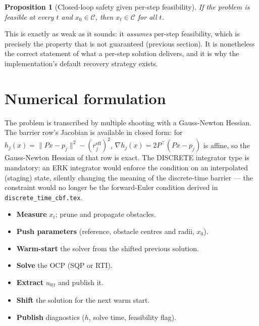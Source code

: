 \documentclass[11pt]{article}
\newtheorem{proposition}{Proposition}
\begin{document}
\begin{proposition}[Closed-loop safety given per-step feasibility]
If the problem is feasible at every $t$ and $x_0 \in \mathcal{C}$, then $x_t \in \mathcal{C}$ for
all $t$.
\end{proposition}
This is exactly as weak as it sounds: it \emph{assumes} per-step feasibility, which is precisely
the property that is not guaranteed (previous section). It is nonetheless the correct statement of
what a per-step solution delivers, and it is why the implementation's default recovery strategy
exists.

\section{Numerical formulation}
The problem is transcribed by multiple shooting with a Gauss-Newton Hessian. The barrier row's
Jacobian is available in closed form: for $h_j(x) = \|Px - p_j\|^2 - (r_j^{\mathrm{eff}})^2$,
$\nabla h_j(x) = 2P^\top(Px - p_j)$ is affine, so the Gauss-Newton Hessian of that row is exact.
The DISCRETE integrator type is mandatory: an ERK integrator would enforce the condition on an
interpolated (staging) state, silently changing the meaning of the discrete-time barrier --- the
constraint would no longer be the forward-Euler condition derived in
\texttt{discrete\_time\_cbf.tex}.

\begin{itemize}
\item \textbf{Measure} $x_t$; prune and propagate obstacles.
\item \textbf{Push parameters} (reference, obstacle centres and radii, $x_0$).
\item \textbf{Warm-start} the solver from the shifted previous solution.
\item \textbf{Solve} the OCP (SQP or RTI).
\item \textbf{Extract} $u_{0|t}$ and publish it.
\item \textbf{Shift} the solution for the next warm start.
\item \textbf{Publish} diagnostics ($h$, solve time, feasibility flag).
\end{itemize}
\end{document}
